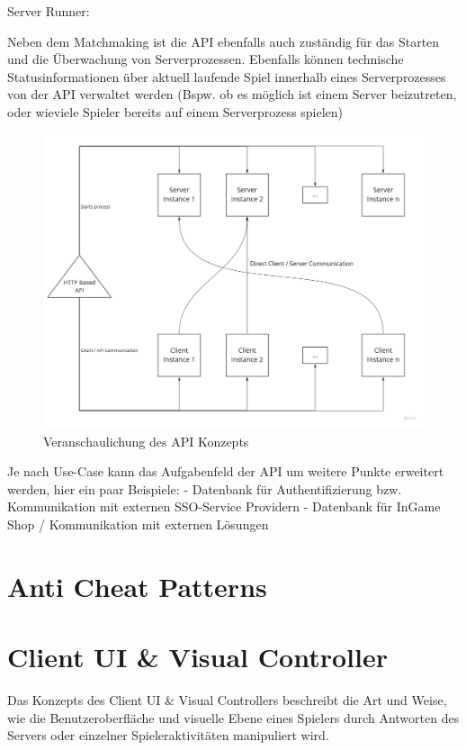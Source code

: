 Server Runner:

Neben dem Matchmaking ist die API ebenfalls auch zuständig für das Starten und die Überwachung von Serverprozessen.
Ebenfalls können technische Statusinformationen über aktuell laufende Spiel innerhalb eines Serverprozesses von der API verwaltet werden (Bspw. ob es möglich ist einem Server beizutreten, oder wieviele Spieler bereits auf einem Serverprozess spielen)

\begin{figure}
	\centering
	\includegraphics[width=150mm]{images/API_Konzept_Diagramm.jpg}
	\caption[API Konzept Diagramm]{Veranschaulichung des API Konzepts}
	\label{pic:API_Konzept_Diagramm}
\end{figure}


Je nach Use-Case kann das Aufgabenfeld der API um weitere Punkte erweitert werden, hier ein paar Beispiele:
- Datenbank für Authentifizierung bzw. Kommunikation mit externen SSO-Service Providern \cite{Wikipedia.2021c} 
- Datenbank für InGame Shop / Kommunikation mit externen Lösungen

\section{Anti Cheat Patterns}


\section{Client UI \& Visual Controller}

Das Konzepts des Client UI \& Visual Controllers beschreibt die Art und Weise, wie die Benutzeroberfläche und visuelle Ebene eines Spielers durch Antworten des Servers oder einzelner Spieleraktivitäten manipuliert wird.

